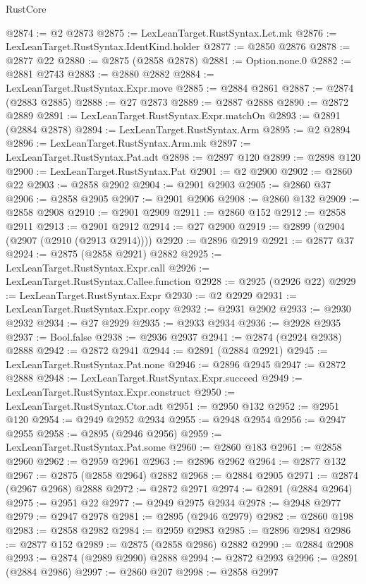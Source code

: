 \begin{lexlean}{RustCore}
\begin{coremodule}
@2874 := @2 @2873
@2875 := LexLeanTarget.RustSyntax.Let.mk
@2876 := LexLeanTarget.RustSyntax.IdentKind.holder
@2877 := @2850 @2876
@2878 := @2877 @22
@2880 := @2875 (@2858 @2878)
@2881 := Option.none.{0}
@2882 := @2881 @2743
@2883 := @2880 @2882
@2884 := LexLeanTarget.RustSyntax.Expr.move
@2885 := @2884 @2861
@2887 := @2874 (@2883 @2885)
@2888 := @27 @2873
@2889 := @2887 @2888
@2890 := @2872 @2889
@2891 := LexLeanTarget.RustSyntax.Expr.matchOn
@2893 := @2891 (@2884 @2878)
@2894 := LexLeanTarget.RustSyntax.Arm
@2895 := @2 @2894
@2896 := LexLeanTarget.RustSyntax.Arm.mk
@2897 := LexLeanTarget.RustSyntax.Pat.adt
@2898 := @2897 @120
@2899 := @2898 @120
@2900 := LexLeanTarget.RustSyntax.Pat
@2901 := @2 @2900
@2902 := @2860 @22
@2903 := @2858 @2902
@2904 := @2901 @2903
@2905 := @2860 @37
@2906 := @2858 @2905
@2907 := @2901 @2906
@2908 := @2860 @132
@2909 := @2858 @2908
@2910 := @2901 @2909
@2911 := @2860 @152
@2912 := @2858 @2911
@2913 := @2901 @2912
@2914 := @27 @2900
@2919 := @2899 (@2904 (@2907 (@2910 (@2913 @2914))))
@2920 := @2896 @2919
@2921 := @2877 @37
@2924 := @2875 (@2858 @2921) @2882
@2925 := LexLeanTarget.RustSyntax.Expr.call
@2926 := LexLeanTarget.RustSyntax.Callee.function
@2928 := @2925 (@2926 @22)
@2929 := LexLeanTarget.RustSyntax.Expr
@2930 := @2 @2929
@2931 := LexLeanTarget.RustSyntax.Expr.copy
@2932 := @2931 @2902
@2933 := @2930 @2932
@2934 := @27 @2929
@2935 := @2933 @2934
@2936 := @2928 @2935
@2937 := Bool.false
@2938 := @2936 @2937
@2941 := @2874 (@2924 @2938) @2888
@2942 := @2872 @2941
@2944 := @2891 (@2884 @2921)
@2945 := LexLeanTarget.RustSyntax.Pat.none
@2946 := @2896 @2945
@2947 := @2872 @2888
@2948 := LexLeanTarget.RustSyntax.Expr.succeed
@2949 := LexLeanTarget.RustSyntax.Expr.construct
@2950 := LexLeanTarget.RustSyntax.Ctor.adt
@2951 := @2950 @132
@2952 := @2951 @120
@2954 := @2949 @2952 @2934
@2955 := @2948 @2954
@2956 := @2947 @2955
@2958 := @2895 (@2946 @2956)
@2959 := LexLeanTarget.RustSyntax.Pat.some
@2960 := @2860 @183
@2961 := @2858 @2960
@2962 := @2959 @2961
@2963 := @2896 @2962
@2964 := @2877 @132
@2967 := @2875 (@2858 @2964) @2882
@2968 := @2884 @2905
@2971 := @2874 (@2967 @2968) @2888
@2972 := @2872 @2971
@2974 := @2891 (@2884 @2964)
@2975 := @2951 @22
@2977 := @2949 @2975 @2934
@2978 := @2948 @2977
@2979 := @2947 @2978
@2981 := @2895 (@2946 @2979)
@2982 := @2860 @198
@2983 := @2858 @2982
@2984 := @2959 @2983
@2985 := @2896 @2984
@2986 := @2877 @152
@2989 := @2875 (@2858 @2986) @2882
@2990 := @2884 @2908
@2993 := @2874 (@2989 @2990) @2888
@2994 := @2872 @2993
@2996 := @2891 (@2884 @2986)
@2997 := @2860 @207
@2998 := @2858 @2997

\end{coremodule}
\end{lexlean}
